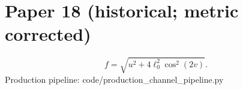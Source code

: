 \documentclass[11pt]{article}
\begin{document}
\section*{Paper 18 (historical; metric corrected)}
\[
f=\sqrt{u^2+4\ell_0^2\cos^2(2v)}.
\]
Production pipeline: code/production\_channel\_pipeline.py
\end{document}
